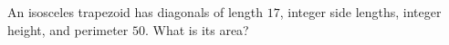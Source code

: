 An isosceles trapezoid has diagonals of length $17$, integer side lengths, integer height, and perimeter $50$. What is its area?
